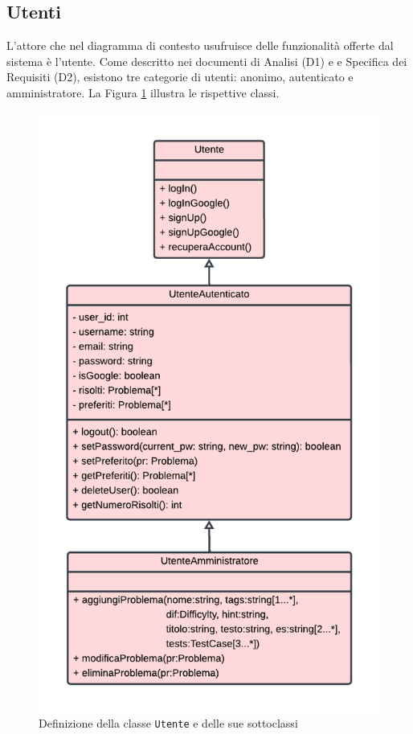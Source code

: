 \documentclass[11pt, a4paper]{article}
\theoremstyle{definition} %
\begin{document}
\subsection{Utenti}
L'attore che nel diagramma di contesto usufruisce delle funzionalità offerte
dal sistema è l'utente. Come descritto nei documenti di Analisi (D1) e
e Specifica dei Requisiti (D2), esistono tre categorie di utenti: anonimo, autenticato
e amministratore. La Figura \ref{utenti} illustra le rispettive classi.

\begin{figure}[H]
\centering
\includegraphics[scale = 0.65]{materiale/class-utenti.pdf}
\caption{Definizione della classe \texttt{Utente} e delle sue sottoclassi}
\label{utenti}
\end{figure}
\end{document}
